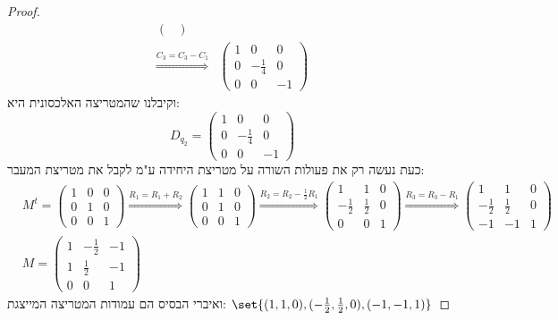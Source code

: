 \documentclass{article}
\DeclarePairedDelimiter\set\{\}
\begin{document}
\begin{proof}
\begin{align*}
\begin{pmatrix}
            \end{pmatrix} \\
            \overset{C_3 = C_3 - C_1}\Rightarrow
            &\begin{pmatrix}
                1           & 0             & 0 \\
                0           & -\frac{1}{4}  & 0 \\
                0           & 0             & -1
            \end{pmatrix}
        \end{align*}
        וקיבלנו שהמטריצה האלכסונית היא:
        \[
        D_{q_2} =             \begin{pmatrix}
            1           & 0             & 0 \\
            0           & -\frac{1}{4}  & 0 \\
            0           & 0             & -1
            \end{pmatrix}
        \]
        כעת נעשה רק את פעולות השורה על מטריצת היחידה ע"מ לקבל את מטריצת המעבר:
        \begin{align*}
            &M^t =
            \begin{pmatrix}
                1 & 0  & 0 \\
                0 & 1  & 0 \\
                0 & 0  & 1
            \end{pmatrix}
            \overset{R_1 = R_1 + R_2}\Rightarrow
            \begin{pmatrix}
                1 & 1  & 0 \\
                0 & 1  & 0 \\
                0 & 0  & 1
            \end{pmatrix}
            \overset{R_2 = R_2 - \frac{1}{2}R_1}\Rightarrow
            \begin{pmatrix}
                1 & 1  & 0 \\
                -\frac{1}{2} & \frac{1}{2}  & 0 \\
                0 & 0  & 1
            \end{pmatrix}
            \overset{R_3 = R_3 - R_1}\Rightarrow
            \begin{pmatrix}
                1 & 1  & 0 \\
                -\frac{1}{2} & \frac{1}{2}  & 0 \\
                -1 & -1  & 1
            \end{pmatrix} \\
            &M =  \begin{pmatrix}
                1 & -\frac{1}{2}  & -1 \\
                1 & \frac{1}{2}   & -1 \\
                0 & 0             & 1
                \end{pmatrix}
        \end{align*}
        ואיברי הבסיס הם עמודות המטריצה המייצגת: $\set{(1,1,0), (-\frac{1}{2}, \frac{1}{2}, 0), (-1, -1, 1)}$
    \end{proof}
\end{document}
